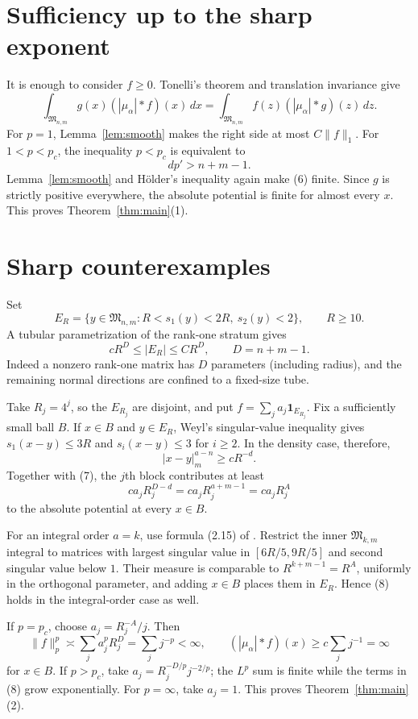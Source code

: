 \documentclass[11pt]{article}
\newcommand{\M}{\mathfrak M}
\begin{document}
\section{Sufficiency up to the sharp exponent}

It is enough to consider $f\ge0$.  Tonelli's theorem and translation
invariance give
\[
 \int_{\M_{n,m}}g(x)(|\mu_\alpha|*f)(x)\,dx
 =\int_{\M_{n,m}}f(z)(|\mu_\alpha|*g)(z)\,dz. \tag{6}
\]
For $p=1$, Lemma~\ref{lem:smooth} makes the right side at most
$C\|f\|_1$.  For $1<p<p_c$, the inequality $p<p_c$ is equivalent to
\[
 d p'>n+m-1.
\]
Lemma~\ref{lem:smooth} and H\"older's inequality again make (6) finite.
Since $g$ is strictly positive everywhere, the absolute potential is finite
for almost every $x$.  This proves Theorem~\ref{thm:main}(1).

\section{Sharp counterexamples}

Set
\[
 E_R=\{y\in\M_{n,m}:R<s_1(y)<2R,\ s_2(y)<2\},\qquad R\ge10.
\]
A tubular parametrization of the rank-one stratum gives
\[
 cR^D\le |E_R|\le CR^D,\qquad D=n+m-1. \tag{7}
\]
Indeed a nonzero rank-one matrix has $D$ parameters (including radius),
and the remaining normal directions are confined to a fixed-size tube.

Take $R_j=4^j$, so the $E_{R_j}$ are disjoint, and put
$f=\sum_ja_j\mathbf1_{E_{R_j}}$.  Fix a sufficiently small ball $B$.
If $x\in B$ and $y\in E_R$, Weyl's singular-value inequality gives
$s_1(x-y)\le3R$ and $s_i(x-y)\le3$ for $i\ge2$.  In the density case,
therefore,
\[
 |x-y|_m^{a-n}\ge cR^{-d}.
\]
Together with (7), the $j$th block contributes at least
\[
 c a_jR_j^{D-d}=c a_jR_j^{a+m-1}=c a_jR_j^A \tag{8}
\]
to the absolute potential at every $x\in B$.

For an integral order $a=k$, use formula (2.15) of \cite{OOR}.  Restrict
the inner $\M_{k,m}$ integral to matrices with largest singular value in
$[6R/5,9R/5]$ and second singular value below $1$.  Their measure is
comparable to $R^{k+m-1}=R^A$, uniformly in the orthogonal parameter, and
adding $x\in B$ places them in $E_R$.  Hence (8) holds in the integral-order
case as well.

If $p=p_c$, choose $a_j=R_j^{-A}/j$.  Then
\[
 \|f\|_p^p\asymp\sum_j a_j^pR_j^D=\sum_jj^{-p}<\infty,
 \qquad
 (|\mu_\alpha|*f)(x)\ge c\sum_jj^{-1}=\infty
\]
for $x\in B$.  If $p>p_c$, take
$a_j=R_j^{-D/p}j^{-2/p}$; the $L^p$ sum is finite while the terms in
(8) grow exponentially.  For $p=\infty$, take $a_j=1$.
This proves Theorem~\ref{thm:main}(2).
\end{document}
